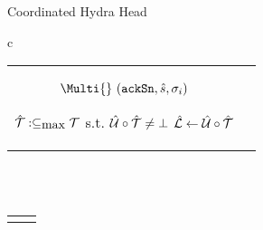 \begin{figure*}[t!]
\begin{algobox}{Coordinated Hydra Head}
\begin{tabular}{c}
\begin{tabular}{c@{}c}
{\begin{walgo}{0.65}
{{               $\Multi{}~(\hpAS,\hats,\msSig_i)$ %

                 $\hat {\mathcal T} :\subseteq_{\mbox{max}} {\mathcal T}$ s.t. $\hat {\mathcal U}\circ\hat {\mathcal T}\not=\bot$ \; %
                 $\hat {\mathcal L} \gets \hat {\mathcal U}\circ\hat {\mathcal T}$
            }
           }
          
        \end{walgo}
        }
        &

        \adjustbox{valign=t,scale=\sfact}{
        \begin{walgo}{0.6}
          \On{$(\hpAS,s,\msSig_j)$ from $\party_j$}{ %

            \Req{} $s \in \{\hats,\hats+1\} ~ \land ~ (j,\msSig_j) \notin \Sigma$
            \; %

            \Wait{$\hats=s$
            }{ %
            

            $\Sigma \gets \Sigma \cup (j,\msSig_j)$ \; %

            \If{$\forall k \in [1..n]: (k,\cdot) \in \Sigma$}{ %
              $\msCSig \gets \msComb(\msVKL, \Sigma)$ \; %

              \Req{} $\msVfy(\msCVK, (\Uinit, \hatmU, \hats), \msCSig)$ \;
              $\bars \gets \hats$ \; %
              $\barmU \gets (\hatmU, \bars, \msCSig)$ \; %



              \If{$\hats = \bars \land \hpLdr(\bars + 1) = i \land \hatmT \neq \emptyset$}{%
                \Multi{} $(\hpRS,\bars+1,\hatmT\hpProjH)$ \;%
              }
            }
          } }
        \end{walgo}

          }

      \end{tabular}

      \\
      \\

      \begin{tabular}{c c}
        \adjustbox{valign=t,scale=\sfact}{
        \begin{walgo}{0.6}


\end{walgo}}
\end{tabular}
\end{tabular}
\end{algobox}
\end{figure*}
